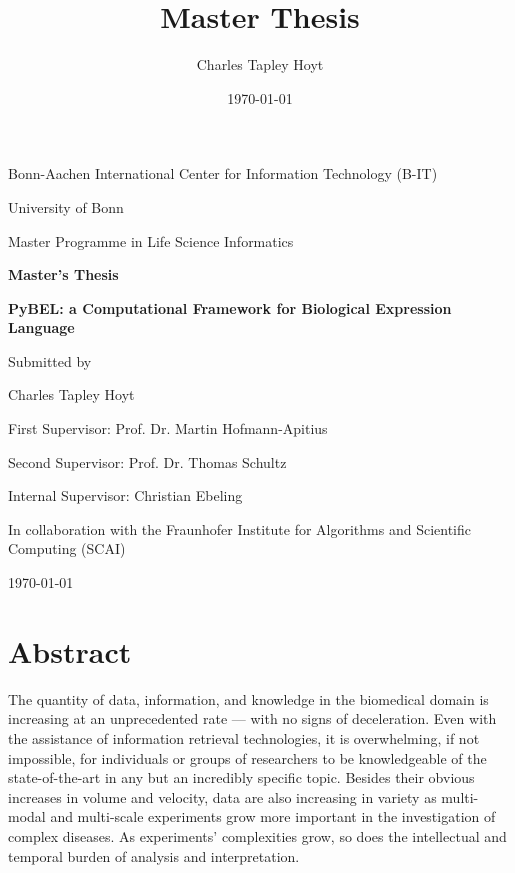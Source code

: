 \documentclass[twoside, 12pt,  footinclude=true,  headinclude=true,  cleardoublepage=empty]{scrbook}
\title{Master Thesis}
\author{Charles Tapley Hoyt}
\date{\today}
\begin{document}
	\begin{titlepage}
		\centering
		Bonn-Aachen International Center for Information Technology (B-IT)
		
		University of Bonn
		
		 Master Programme in Life Science Informatics
		
		\vspace{1in}
		 {\Large \bfseries Master's Thesis}
		\vspace{1in}
		
		{\LARGE \bfseries PyBEL: a Computational Framework for Biological Expression Language}
		\vspace{1in}
		
		{\large Submitted by}
		
		{\LARGE Charles Tapley Hoyt\par}
		
		\vspace{1in}
		
			First Supervisor: Prof. Dr. Martin Hofmann-Apitius
			\par
			Second Supervisor: Prof. Dr. Thomas Schultz
			\par
			Internal Supervisor: Christian Ebeling
			
		\vfill
		In collaboration with the Fraunhofer Institute for Algorithms and Scientific Computing (SCAI)
		\begin{flushleft}
			\today
		\end{flushleft}
		
	\end{titlepage}
	
	
	
	\frontmatter


\tableofcontents


\chapter*{Abstract}
The quantity of data, information, and knowledge in the biomedical domain is increasing at an unprecedented rate — with no signs of deceleration. Even with the assistance of information retrieval technologies, it is overwhelming, if not impossible, for individuals or groups of researchers to be knowledgeable of the state-of-the-art in any but an incredibly specific topic. Besides their obvious increases in volume and velocity, data are also increasing in variety as multi-modal and multi-scale experiments grow more important in the investigation of complex diseases. As experiments' complexities grow, so does the intellectual and temporal burden of analysis and interpretation. 
\end{document}
